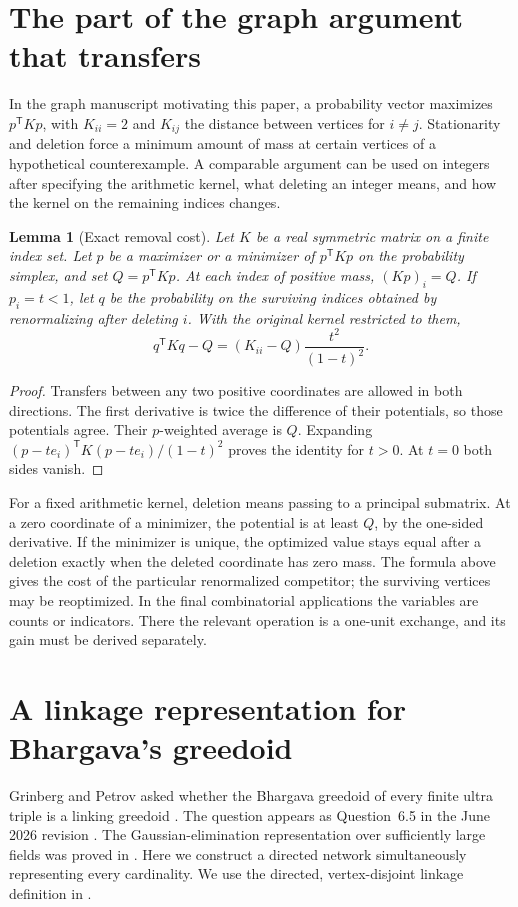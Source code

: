 \documentclass[11pt,a4paper]{article}
\newtheorem{lemma}[theorem]{Lemma}
\begin{document}
\section{The part of the graph argument that transfers}
In the graph manuscript motivating this paper, a probability vector maximizes $p^{\mathsf T}Kp$, with $K_{ii}=2$ and $K_{ij}$ the distance between vertices for $i\ne j$. Stationarity and deletion force a minimum amount of mass at certain vertices of a hypothetical counterexample. A comparable argument can be used on integers after specifying the arithmetic kernel, what deleting an integer means, and how the kernel on the remaining indices changes.
\begin{lemma}[Exact removal cost]\label{lem:remove}
Let $K$ be a real symmetric matrix on a finite index set. Let $p$ be a maximizer or a minimizer of $p^{\mathsf T}Kp$ on the probability simplex, and set $Q=p^{\mathsf T}Kp$. At each index of positive mass, $(Kp)_i=Q$. If $p_i=t<1$, let $q$ be the probability on the surviving indices obtained by renormalizing after deleting $i$. With the original kernel restricted to them,
\begin{equation}\label{eq:remove}
 q^{\mathsf T}Kq-Q=(K_{ii}-Q)\frac{t^2}{(1-t)^2}.
\end{equation}
\end{lemma}
\begin{proof}
Transfers between any two positive coordinates are allowed in both directions. The first derivative is twice the difference of their potentials, so those potentials agree. Their $p$-weighted average is $Q$. Expanding $(p-t e_i)^{\mathsf T}K(p-t e_i)/(1-t)^2$ proves the identity for $t>0$. At $t=0$ both sides vanish.
\end{proof}
For a fixed arithmetic kernel, deletion means passing to a principal submatrix. At a zero coordinate of a minimizer, the potential is at least $Q$, by the one-sided derivative. If the minimizer is unique, the optimized value stays equal after a deletion exactly when the deleted coordinate has zero mass. The formula above gives the cost of the particular renormalized competitor; the surviving vertices may be reoptimized. In the final combinatorial applications the variables are counts or indicators. There the relevant operation is a one-unit exchange, and its gain must be derived separately.

\section{A linkage representation for Bhargava's greedoid}
\label{sec:bhargava-linking}
Grinberg and Petrov asked whether the Bhargava greedoid of every finite ultra triple is a linking greedoid \cite[Question~29]{gp}. The question appears as Question~6.5 in the June 2026 revision \cite{gprev}. The Gaussian-elimination representation over sufficiently large fields was proved in \cite{grin}. Here we construct a directed network simultaneously representing every cardinality. We use the directed, vertex-disjoint linkage definition in \cite[Sec.~IV.2.15, p.~53 and Sec.~IX.4, p.~137]{kls}.
\end{document}
